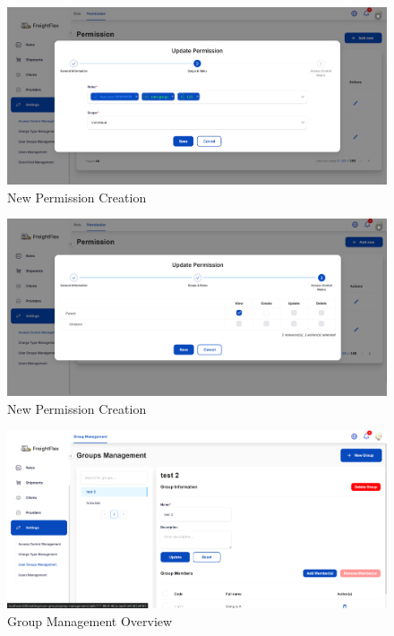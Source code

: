 \begin{figure}[H]
    \centering
    \includegraphics[width=15cm]{graphics/UI/new-permission.png}
    \caption{New Permission Creation}
    \label{fig:new-permission}
\end{figure}

\begin{figure}[H]
    \centering
    \includegraphics[width=15cm]{graphics/UI/new-permission-2.png}
    \caption{New Permission Creation}
    \label{fig:new-permission-2}
\end{figure}

\begin{figure}[H]
    \centering
    \includegraphics[width=15cm]{graphics/UI/group-management.png}
    \caption{Group Management Overview}
    \label{fig:group-management}
\end{figure}

